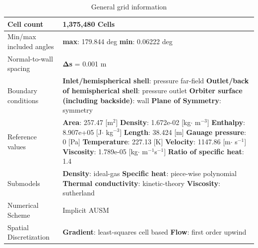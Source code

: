 \begin{table}[H]
\caption{General grid information}
	\centering
	\begin{tabular}{|l|p{4.5in}|} \hline
		Cell count & 1,375,480 Cells  \\ \hline
		Min/max included angles & \textbf{max}: 179.844 deg \textbf{min}: 0.06222 deg \\ \hline
		Normal-to-wall spacing & $\boldsymbol{\Delta}$\textbf{s} = 0.001 m \\ \hline
		Boundary conditions & \textbf{Inlet/hemispherical shell}: pressure far-field \newline \textbf{Outlet/back of hemispherical shell}: pressure outlet \newline \textbf{Orbiter surface (including backside)}: wall \newline \textbf{Plane of Symmetry}: symmetry \\ \hline
		Reference values & \textbf{Area}: 257.47 [m$^2$] \newline \textbf{Density}: 1.672e-02 [kg$\cdot$ m$^{-3}$] \newline \textbf{Enthalpy}: 8.907e+05 [J$\cdot$ kg$^{-3}$] \newline \textbf{Length}: 38.424 [m] \newline \textbf{Gauage pressure}: 0 [Pa] \newline \textbf{Temperature}: 227.13 [K] \newline \textbf{Velocity}: 1147.86 [m$\cdot$ s$^{-1}$] \newline \textbf{Viscosity}: 1.789e-05 [kg$\cdot$ m$^{-1}$s$^{-1}$] \newline \textbf{Ratio of specific heat}: 1.4 \\ \hline
		Submodels & \textbf{Density}: ideal-gas \newline \textbf{Specific heat}: piece-wise polynomial \newline \textbf{Thermal conductivity}: kinetic-theory \newline \textbf{Viscosity}: sutherland \\ \hline
		Numerical Scheme & Implicit AUSM \\ \hline
		Spatial Discretization & \textbf{Gradient}: least-squares cell based \newline \textbf{Flow}: first order upwind \\ \hline
	\end{tabular}
\end{table}